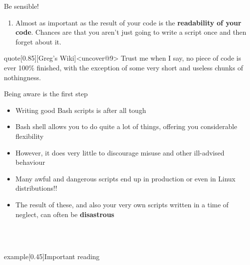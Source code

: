 \begin{frame}{Be sensible!}
{\begin{onlyenv}
\begin{enumerate}[<+->]
                      Any script you'll find on the Web is likely to be broken in some way.
                      \alert{Do not copy/paste from them!}
                \item Almost as important as the result of your code is the \textbf{readability of your code}.
                      Chances are that you aren't just going to write a script once and then forget about it.
            \end{enumerate}
            \vspace{3mm}
            \begin{varblock}{quote}[0.85\textwidth]{}[Greg's Wiki]<uncover@9>
                Trust me when I say, no piece of code is ever 100\% finished, with the exception of some very short and useless chunks of nothingness.
            \end{varblock}
        \end{onlyenv}
    }
\end{frame}
\begin{frame}{Being aware is the first step}
    \begin{itemize}
        \item Writing good Bash scripts is after all tough
        \item Bash shell allows you to do quite a lot of things, offering you considerable flexibility
        \item However, it does very little to discourage misuse and other ill-advised behaviour
        \item Many awful and dangerous scripts end up in production or even in Linux distributions!!
        \item The result of these, and also your very own scripts written in a time of neglect, can often be \textbf{disastrous}
    \end{itemize}
    \begin{lrbox}{\tmpbox}
        \begin{minipage}{0.85\textwidth}
            \\
            \\
        \end{minipage}
    \end{lrbox}
    \begin{varblock*}{example}[0.45\textwidth]{Important reading}
        \usebox{\tmpbox}
    \end{varblock*}
\end{frame}
